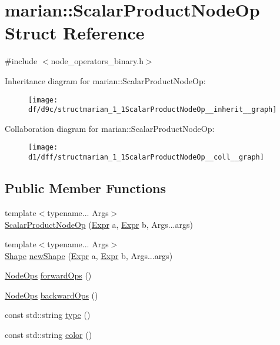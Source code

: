 \hypertarget{structmarian_1_1ScalarProductNodeOp}{}\section{marian\+:\+:Scalar\+Product\+Node\+Op Struct Reference}
\label{structmarian_1_1ScalarProductNodeOp}


{\ttfamily \#include $<$node\+\_\+operators\+\_\+binary.\+h$>$}



Inheritance diagram for marian\+:\+:Scalar\+Product\+Node\+Op\+:
\nopagebreak
\begin{figure}[H]
\begin{center}
\leavevmode
\texttt{[image: df/d9c/structmarian\_1\_1ScalarProductNodeOp\_\_inherit\_\_graph]}
\end{center}
\end{figure}


Collaboration diagram for marian\+:\+:Scalar\+Product\+Node\+Op\+:
\nopagebreak
\begin{figure}[H]
\begin{center}
\leavevmode
\texttt{[image: d1/dff/structmarian\_1\_1ScalarProductNodeOp\_\_coll\_\_graph]}
\end{center}
\end{figure}
\subsection*{Public Member Functions}
\begin{DoxyCompactItemize}
\item 
{\footnotesize template$<$typename... Args$>$ }\\\hyperlink{structmarian_1_1ScalarProductNodeOp_ab5e665a3dc2a9c6601182f7b9f3b4c39}{Scalar\+Product\+Node\+Op} (\hyperlink{namespacemarian_a498d8baf75b754011078b890b39c8e12}{Expr} a, \hyperlink{namespacemarian_a498d8baf75b754011078b890b39c8e12}{Expr} b, Args...\+args)
\item 
{\footnotesize template$<$typename... Args$>$ }\\\hyperlink{structmarian_1_1Shape}{Shape} \hyperlink{structmarian_1_1ScalarProductNodeOp_ae050799808ccec985a488ab6849944fe}{new\+Shape} (\hyperlink{namespacemarian_a498d8baf75b754011078b890b39c8e12}{Expr} a, \hyperlink{namespacemarian_a498d8baf75b754011078b890b39c8e12}{Expr} b, Args...\+args)
\item 
\hyperlink{namespacemarian_a4956376218cc236016c20bc4071470da}{Node\+Ops} \hyperlink{structmarian_1_1ScalarProductNodeOp_ab3be975c79c5bf5337b9110f1f5e05b2}{forward\+Ops} ()
\item 
\hyperlink{namespacemarian_a4956376218cc236016c20bc4071470da}{Node\+Ops} \hyperlink{structmarian_1_1ScalarProductNodeOp_ad8f0e8f1aa0b07f36280265ce5b2d808}{backward\+Ops} ()
\item 
const std\+::string \hyperlink{structmarian_1_1ScalarProductNodeOp_abce18c14be11adeb27417cd5a3f6d866}{type} ()
\item 
const std\+::string \hyperlink{structmarian_1_1ScalarProductNodeOp_ae79cbb113a6dc429415721240e21d8af}{color} ()
\end{DoxyCompactItemize}
